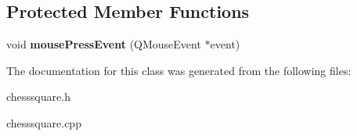 \subsection*{Protected Member Functions}
\begin{DoxyCompactItemize}
\item 
\mbox{\label{classchessSquare_a237c7ccd0ba13d99c0f6eff2162fbf48}} 
void {\bfseries mouse\+Press\+Event} (Q\+Mouse\+Event $\ast$event)
\end{DoxyCompactItemize}


The documentation for this class was generated from the following files\+:\begin{DoxyCompactItemize}
\item 
chesssquare.\+h\item 
chesssquare.\+cpp\end{DoxyCompactItemize}
